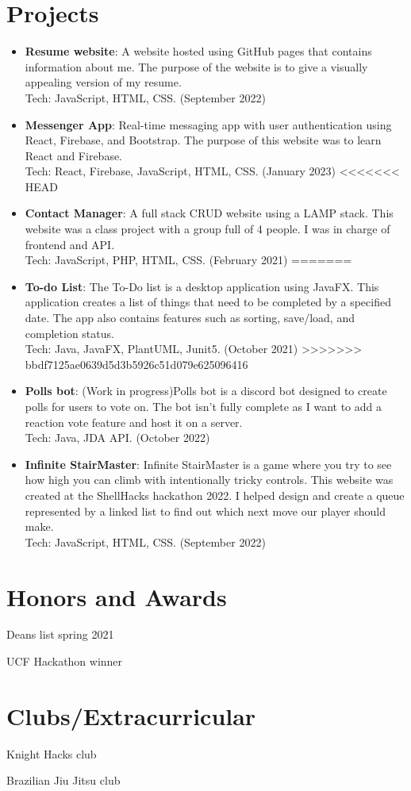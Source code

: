 \documentclass[a4paper,20pt]{article}
\newcommand{\resumeItem}[2]{
  \item\normalsize{
    \textbf{#1}{: #2 \vspace{1pt}}
  }
}
\newcommand{\resumeSubItem}[2]{\resumeItem{#1}{#2}\vspace{1pt}}
\newcommand{\resumeSubHeadingListStart}{\begin{itemize}[leftmargin=*]}
\newcommand{\resumeSubHeadingListEnd}{\end{itemize}}
\begin{document}
    
    \section{Projects}
        \resumeSubHeadingListStart
            \resumeSubItem{Resume website}{A website hosted using GitHub pages that contains information about me. The purpose of the website is to give a visually appealing version of my resume.\\Tech: JavaScript, HTML, CSS. (September 2022)}
            \resumeSubItem{Messenger App}{Real-time messaging app with user authentication using React, Firebase, and Bootstrap. The purpose of this website was to learn React and Firebase.
            \\Tech: React, Firebase, JavaScript, HTML, CSS. (January 2023)}
<<<<<<< HEAD
            \resumeSubItem{Contact Manager}{ A full stack CRUD website using a LAMP stack. This website was a class project with a group full of 4 people. I was in charge of frontend and API.
            \\Tech: JavaScript, PHP, HTML, CSS. (February 2021)}
=======
            \resumeSubItem{To-do List}{The To-Do list is a desktop application using JavaFX. This application creates a list of things that need to be completed by a specified date. The app also contains features such as sorting, save/load, and completion status.  \\Tech: Java, JavaFX, PlantUML, Junit5. (October 2021)}
>>>>>>> bbdf7125ae0639d5d3b5926c51d079e625096416
            \resumeSubItem{Polls bot}{(Work in progress)Polls bot is a discord bot designed to create polls for users to vote on. The bot isn't fully complete as I want to add a reaction vote feature and host it on a server.\\Tech: Java, JDA API. (October 2022)}
            \resumeSubItem{Infinite StairMaster}{Infinite StairMaster is a game where you try to see how high you can climb with intentionally tricky controls. This website was created at the ShellHacks hackathon 2022. I helped design and create a queue represented by a linked list to find out which next move our player should make. \\Tech: JavaScript, HTML, CSS. (September 2022)}
            \vspace{2pt}
        \resumeSubHeadingListEnd
    
    
    \section{Honors and Awards}
        \begin{description}[font=$\bullet$]
            \item {Deans list spring 2021}
            \item {UCF Hackathon winner}
        \end{description}
        
    \section{Clubs/Extracurricular}
        \begin{description}[font=$\bullet$]
            \item {Knight Hacks club}
            \item {Brazilian Jiu Jitsu club}
        \end{description}
        
\end{document}
